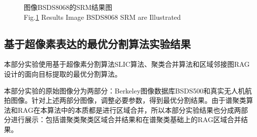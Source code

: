 \begin{figure}[H]
\centering
    \captionsetup{justification=centering}
    \caption{图像BSDS8068的SRM结果图 \\ Fig.\ref{SRM结果图3} Results Image BSDS8068 SRM are Illustrated}\label{SRM结果图3}
\end{figure}


\subsection{基于超像素表达的最优分割算法实验结果}

本部分实验使用基于超像素分割算法SLIC算法、聚类合并算法和区域邻接图RAG设计的面向目标提取的最优分割算法。

本部分实验的原始图像分为两部分：Berkeley图像数据库BSDS500和真实无人机航拍图像。针对上述两部分图像，调整必要参数，得到最优分割结果。由于谱聚类算法和RAG在本算法中的本质都是进行区域合并，所以本部分实验结果也分成两部分进行展示：包括谱聚类聚类区域合并结果和在谱聚类基础上的RAG区域合并结果。

